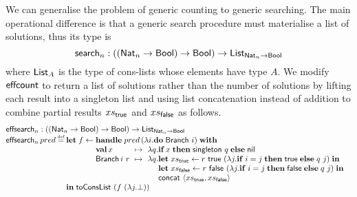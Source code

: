 \documentclass[12pt,phd,lfcs,twoside,openright,logo,leftchapter,normalheadings]{infthesis}
\theoremstyle{plain}
\theoremstyle{definition}
\begin{document}
We can generalise the problem of generic counting to generic
searching. The main operational difference is that a generic search
procedure must materialise a list of solutions, thus its type is
%
{\small
\[
  \mathsf{search}_{n} : ((\mathsf{Nat}_n \to \mathsf{Bool}) \to \mathsf{Bool}) \to \mathsf{List}_{\mathsf{Nat}_n \to \mathsf{Bool}}
\]}%
%
where $\mathsf{List}_A$ is the type of cons-lists whose elements have type
$A$.
%
We modify $\mathsf{effcount}$ to return a list of solutions rather than the
number of solutions by lifting each result into a singleton list and
using list concatenation instead of addition to combine partial
results $xs_{\mathsf{true}}$ and $xs_{\mathsf{false}}$ as follows.
%
\newcommand{\ESearch}{\mathsf{effsearch}}
\newcommand{\Singleton}{\mathsf{singleton}}
\newcommand{\Concat}{\mathsf{concat}}
\newcommand{\HughesList}{\mathsf{HList}}
\newcommand{\ToConsList}{\mathsf{toConsList}}
{\small
\[
  \bl
    \ESearch_n : ((\Nat_n \to \Bool) \to \Bool) \to \List_{\Nat_n \to \Bool}\\
    \ESearch_n\,pred \defas
         \bl\Let\; f \revto \bl
                             \Handle\; pred\,(\lambda i. \Do\; \Branch~i)\; \With\\
                             \ba[t]{@{}l@{\hspace{1.5ex}}c@{\hspace{1.5ex}}l@{}}
                                           \Val\, x        &\mapsto& \lambda q. \If\, x \;\Then\; \Singleton~q \;\Else\; \dec{nil} \\
                                           \Branch\,i\,\,r &\mapsto&
                                             \ba[t]{@{}l}\lambda q.
                                                \ba[t]{@{}l}
                                                 \Let\;xs_\True \revto  r~\True~(\lambda j.\If\;i=j\;\Then\;\True\;\Else\;q~j) \;\In\\
                                                 \Let\;xs_\False \revto r~\False~(\lambda j. \If\;i=j\;\Then\;\False\;\Else\;q~j) \;\In\\
                                                 \Concat~\Record{xs_\True,xs_\False} \\
                                                 \ea\\
                                             \ea\\
                              \ea \\
                              \el \\
             \In\;\ToConsList~(f~(\lambda j. \bot))
          \el \\
  \el
\]}%
\end{document}

